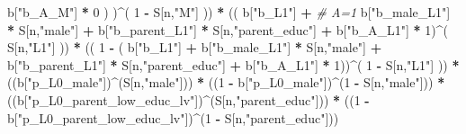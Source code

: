 \documentclass[
]{book}
\newenvironment{Shaded}{\begin{snugshade}}{\end{snugshade}}
\newcommand{\CommentTok}[1]{\textcolor[rgb]{0.56,0.35,0.01}{\textit{#1}}}
\newcommand{\DecValTok}[1]{\textcolor[rgb]{0.00,0.00,0.81}{#1}}
\newcommand{\NormalTok}[1]{#1}
\newcommand{\SpecialCharTok}[1]{\textcolor[rgb]{0.81,0.36,0.00}{\textbf{#1}}}
\newcommand{\StringTok}[1]{\textcolor[rgb]{0.31,0.60,0.02}{#1}}
\begin{document}
\begin{Shaded}
\begin{Highlighting}[]
\NormalTok{                b[}\StringTok{"b\_A\_M"}\NormalTok{] }\SpecialCharTok{*} \DecValTok{0}\NormalTok{ ) )}\SpecialCharTok{\^{}}\NormalTok{( }\DecValTok{1} \SpecialCharTok{{-}}\NormalTok{ S[n,}\StringTok{"M"}\NormalTok{] )) }\SpecialCharTok{*}
\NormalTok{      (( b[}\StringTok{"b\_L1"}\NormalTok{] }\SpecialCharTok{+}                                                            \CommentTok{\# A=1}
\NormalTok{           b[}\StringTok{"b\_male\_L1"}\NormalTok{] }\SpecialCharTok{*}\NormalTok{ S[n,}\StringTok{"male"}\NormalTok{] }\SpecialCharTok{+}  
\NormalTok{           b[}\StringTok{"b\_parent\_L1"}\NormalTok{] }\SpecialCharTok{*}\NormalTok{ S[n,}\StringTok{"parent\_educ"}\NormalTok{] }\SpecialCharTok{+}
\NormalTok{           b[}\StringTok{"b\_A\_L1"}\NormalTok{] }\SpecialCharTok{*} \DecValTok{1}\NormalTok{)}\SpecialCharTok{\^{}}\NormalTok{( S[n,}\StringTok{"L1"}\NormalTok{] )) }\SpecialCharTok{*}
\NormalTok{      (( }\DecValTok{1} \SpecialCharTok{{-}}\NormalTok{ ( b[}\StringTok{"b\_L1"}\NormalTok{] }\SpecialCharTok{+}
\NormalTok{                 b[}\StringTok{"b\_male\_L1"}\NormalTok{] }\SpecialCharTok{*}\NormalTok{ S[n,}\StringTok{"male"}\NormalTok{] }\SpecialCharTok{+}  
\NormalTok{                 b[}\StringTok{"b\_parent\_L1"}\NormalTok{] }\SpecialCharTok{*}\NormalTok{ S[n,}\StringTok{"parent\_educ"}\NormalTok{] }\SpecialCharTok{+}
\NormalTok{                 b[}\StringTok{"b\_A\_L1"}\NormalTok{] }\SpecialCharTok{*} \DecValTok{1}\NormalTok{))}\SpecialCharTok{\^{}}\NormalTok{( }\DecValTok{1} \SpecialCharTok{{-}}\NormalTok{ S[n,}\StringTok{"L1"}\NormalTok{] )) }\SpecialCharTok{*}
\NormalTok{      ((b[}\StringTok{"p\_L0\_male"}\NormalTok{])}\SpecialCharTok{\^{}}\NormalTok{(S[n,}\StringTok{"male"}\NormalTok{])) }\SpecialCharTok{*} 
\NormalTok{      ((}\DecValTok{1} \SpecialCharTok{{-}}\NormalTok{ b[}\StringTok{"p\_L0\_male"}\NormalTok{])}\SpecialCharTok{\^{}}\NormalTok{(}\DecValTok{1} \SpecialCharTok{{-}}\NormalTok{ S[n,}\StringTok{"male"}\NormalTok{])) }\SpecialCharTok{*} 
\NormalTok{      ((b[}\StringTok{"p\_L0\_parent\_low\_educ\_lv"}\NormalTok{])}\SpecialCharTok{\^{}}\NormalTok{(S[n,}\StringTok{"parent\_educ"}\NormalTok{])) }\SpecialCharTok{*}
\NormalTok{      ((}\DecValTok{1} \SpecialCharTok{{-}}\NormalTok{ b[}\StringTok{"p\_L0\_parent\_low\_educ\_lv"}\NormalTok{])}\SpecialCharTok{\^{}}\NormalTok{(}\DecValTok{1} \SpecialCharTok{{-}}\NormalTok{ S[n,}\StringTok{"parent\_educ"}\NormalTok{])) }
    

\end{Highlighting}
\end{Shaded}
\end{document}
